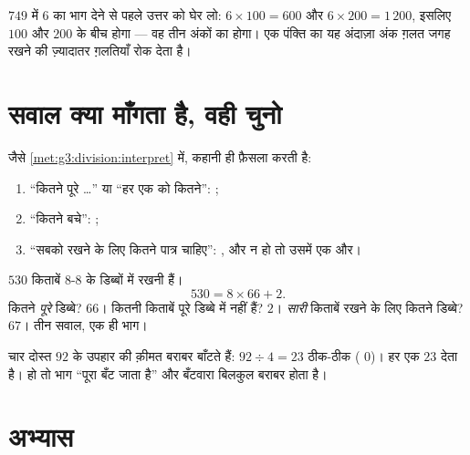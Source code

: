 \begin{example}[भागफल का आकार आँकना]\label{ex:g4:division:size}
$749$ में $6$ का भाग देने से पहले उत्तर को घेर लो:
$6 \times 100 = 600$ और $6 \times 200 = 1\,200$, इसलिए 
$100$ और $200$ के बीच होगा --- वह तीन अंकों का होगा। एक पंक्ति
का यह अंदाज़ा अंक ग़लत जगह रखने की ज़्यादातर ग़लतियाँ रोक देता है।
\end{example}

\section{सवाल क्या माँगता है, वही चुनो}

\begin{method}\label{met:g4:division:interpret}
जैसे \cref{met:g3:division:interpret} में, कहानी ही फ़ैसला करती है:
\begin{enumerate}
  \item ``कितने पूरे \dots'' या ``हर एक को कितने'': ;
  \item ``कितने बचे'': ;
  \item ``सबको रखने के लिए कितने पात्र चाहिए'': , और
          न हो तो उसमें एक और।
\end{enumerate}
\end{method}

\begin{example}\label{ex:g4:division:problem}
$530$ किताबें $8$-$8$ के डिब्बों में रखनी हैं।
\[
530 = 8 \times 66 + 2 .
\]
कितने \emph{पूरे} डिब्बे? $66$। कितनी किताबें पूरे डिब्बे में
नहीं हैं? $2$। \emph{सारी} किताबें रखने के लिए कितने डिब्बे?
$67$। तीन सवाल, एक ही भाग।
\end{example}

\begin{example}[पैसों का बराबर बँटवारा]\label{ex:g4:division:money}
चार दोस्त $92$ के उपहार की क़ीमत बराबर बाँटते हैं:
$92 \div 4 = 23$ ठीक-ठीक ( $0$)। हर एक $23$ देता है।
  हो तो भाग ``पूरा बँट जाता है'' और बँटवारा बिलकुल
बराबर होता है।
\end{example}

\section{अभ्यास}


